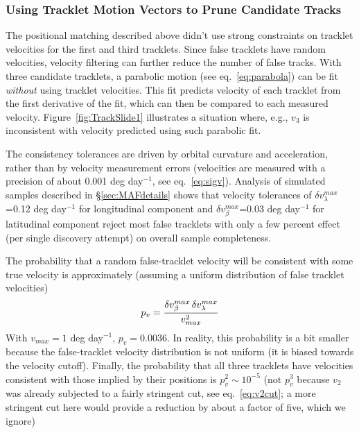 
\subsubsection{Using Tracklet Motion Vectors to Prune Candidate Tracks}

The positional matching described above didn't use strong constraints on tracklet velocities
for the first and third tracklets. Since false tracklets have random velocities, velocity filtering
can further reduce the number of false tracks.
With three candidate tracklets, a parabolic motion (see eq.~\ref{eq:parabola}) can be fit {\it without}
using tracklet velocities. This fit predicts velocity of each tracklet from the first derivative of
the fit, which can then be compared to each measured velocity. Figure~\ref{fig:TrackSlide1}
illustrates a situation where, e.g., $v_3$ is inconsistent with velocity predicted using such
parabolic fit.

The consistency tolerances are driven by orbital curvature and acceleration, rather than
by velocity measurement errors (velocities are measured with a precision of about 0.001
deg day$^{-1}$, see eq.~\ref{eq:sigv}). Analysis of simulated samples described in
\S\ref{sec:MAFdetails} shows that velocity tolerances of $\delta v_\lambda^{max}$=0.12 deg day$^{-1}$
for longitudinal component and $\delta v_\beta^{max}$=0.03 deg day$^{-1}$ for latitudinal component
reject most false tracklets with only a few percent effect (per single discovery attempt) on overall
sample completeness.

The probability that a random false-tracklet velocity will be consistent with some true
velocity is approximately (assuming a uniform distribution of false tracklet velocities)
\begin{equation}
        p_v =  { \delta v_\beta^{max} \, \delta v_\lambda^{max} \over  v_{max}^2 }
\end{equation}
With $v_{max} = 1$ deg day$^{-1}$, $p_v = 0.0036$. In reality, this probability is a bit smaller because
the false-tracklet velocity distribution is not uniform (it is biased towards the velocity cutoff).
Finally, the probability that all three tracklets have velocities consistent with those
implied by their positions is $p_v^2 \sim 10^{-5}$ (not $p_v^3$ because $v_2$ was already
subjected to a fairly stringent cut, see eq.~\ref{eq:v2cut}; a more stringent cut here
would provide a reduction by about a factor of five, which we ignore)

